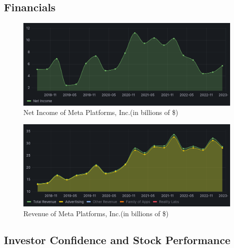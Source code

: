 \documentclass[12pt, a4paper]{article}
\begin{document}

\subsection*{Financials}

\begin{figure}[H]
    \centering
    \includegraphics[width=1.00\textwidth]{net-income}
    \caption{Net Income of Meta Platforms, Inc.(in billions of
    \$)\cite{2023q1,2020q4,2020q3,2020q2,2020q1,2019q4,2019q3,2019q2,2019q1,2018q4,2018q3,2018q2}}
    \label{fig:net-income}
\end{figure}

\begin{figure}[H]
    \centering
    \includegraphics[width=1.00\textwidth]{revenue}
    \caption{Revenue of Meta Platforms, Inc.(in billions of
    \$)\cite{2023q1,2020q4,2020q3,2020q2,2020q1,2019q4,2019q3,2019q2,2019q1,2018q4,2018q3,2018q2}}
    \label{fig:revenue}
\end{figure}

\subsection*{Investor Confidence and Stock Performance}
\end{document}
